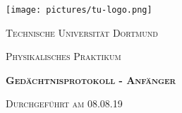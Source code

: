 



\begin{titlepage}
  \centering
  \texttt{[image: pictures/tu-logo.png]}\par\vspace{2cm}
  {\scshape\LARGE Technische Universität Dortmund \par}
  \vspace{1.5cm}
  {\scshape\Large Physikalisches Praktikum\par}
  \vspace{1.5cm}
  {\scshape\LARGE\bfseries Gedächtnisprotokoll - Anfänger\par}
  \vspace{2.5cm}
  {\scshape Durchgeführt am 08.08.19 }
\end{titlepage}

\thispagestyle{empty}
\tableofcontents
\newpage



%




